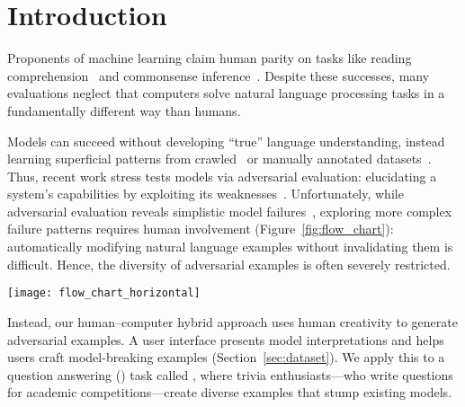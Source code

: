 \section{Introduction}
\label{sec:introduction}

Proponents of machine learning claim human
parity on tasks like reading comprehension~\cite{yu2018qanet}
and commonsense
inference~\cite{devlin2018BERT}. Despite these successes,
many evaluations neglect that computers solve natural language
processing  tasks 
in a fundamentally different way than humans.  

Models can succeed without developing ``true'' language understanding,
instead learning superficial patterns from
crawled~\cite{chen2016thorough} or manually annotated
datasets~\cite{kaushik2018reading,gururangan2018annotation}.  Thus,
recent work stress tests models via adversarial evaluation:
elucidating a system's capabilities by exploiting its
weaknesses~\cite{jia2017adversarial,belinkov2019survey}.
Unfortunately, while adversarial evaluation reveals simplistic model
failures~\cite{ribeiro2018sear,mudrakarta2018understand}, exploring
more complex failure patterns requires human involvement (Figure~\ref{fig:flow_chart}):
automatically modifying natural language examples
without invalidating them is difficult. Hence, the diversity
of adversarial examples is often severely restricted.
	
\begin{figure*}[t]
\centering
\texttt{[image: flow\_chart\_horizontal]}
\caption{Adversarial evaluation in  typically focuses on a specific
  phenomenon (e.g., word replacements) and then generates the corresponding examples (top).
  Consequently, adversarial examples are limited to
  the diversity of what the underlying generative model or perturbation rule can produce and also require downstream
  human evaluation to ensure validity. Our setup (bottom) instead has
  human-authored examples, using human--computer collaboration to craft adversarial examples with greater diversity.}
\label{fig:flow_chart}
\end{figure*}

Instead, our human--computer hybrid approach uses human creativity to
generate adversarial examples.  A user interface presents model
interpretations and helps users craft model-breaking examples
(Section~\ref{sec:dataset}).  We apply this to a question answering
() task called \qb{}, where trivia enthusiasts---who write
questions for academic competitions---create diverse examples
that stump existing  models.

